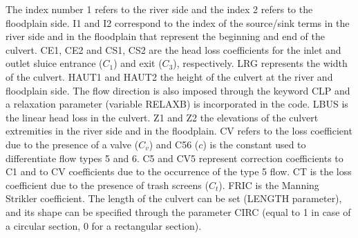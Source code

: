 The index number 1 refers to the river side and the index 2 refers to the floodplain side.
I1 and I2 correspond to the index of the source/sink terms in the river side
and in the floodplain that represent the beginning and end of the culvert.
CE1, CE2 and CS1, CS2 are the head loss coefficients
for the inlet and outlet sluice entrance ($C_1$) and exit ($C_3$), respectively.
LRG represents the width of the culvert.
HAUT1 and HAUT2 the height of the culvert at the river and
floodplain side.
The flow direction is also imposed through the keyword CLP and
a relaxation parameter (variable RELAXB) is incorporated in the code.
LBUS is the linear head loss in the culvert.
Z1 and Z2 the elevations of the culvert
extremities in the river side and in the floodplain.
CV refers to the loss coefficient due to the presence of a valve ($C_v$) and
C56 ($c$) is the constant used to differentiate flow types 5 and 6.
C5 and CV5 represent correction coefficients to C1 and to CV coefficients
due to the occurrence of the type 5 flow.
CT is the loss coefficient due to the presence of trash screens ($C_t$).
FRIC is the Manning Strikler coefficient.
The length of the culvert can be set (LENGTH parameter), and its shape can be specified through the parameter CIRC (equal to 1 in
case of a circular section, 0 for a rectangular section).



